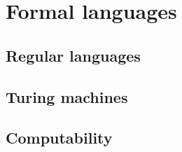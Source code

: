 \chapter{Formal languages}\label{chapter:formal-languages}


\section{Regular languages}



\section{Turing machines}



\section{Computability}


